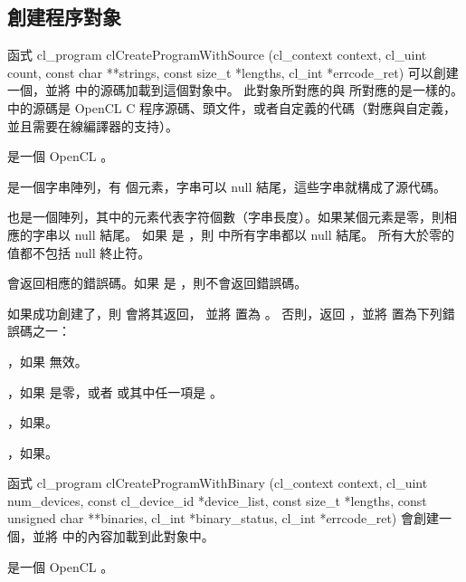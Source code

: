 \subsection{創建程序對象}

函式
\startclc
cl_program clCreateProgramWithSource (cl_context context,
			cl_uint count,
			const char **strings,
			const size_t *lengths,
			cl_int *errcode_ret)
\stopclc
可以創建一個，並將  中的源碼加載到這個對象中。
此對象所對應的與  所對應的是一樣的。
  中的源碼是 OpenCL C 程序源碼、頭文件，或者自定義的代碼（對應與自定義，並且需要在線編譯器的支持）。

 是一個 OpenCL 。

 是一個字串陣列，有  個元素，字串可以 null 結尾，這些字串就構成了源代碼。

 也是一個陣列，其中的元素代表字符個數（字串長度）。如果某個元素是零，則相應的字串以 null 結尾。
如果  是 ，則  中所有字串都以 null 結尾。
所有大於零的值都不包括 null 終止符。

 會返回相應的錯誤碼。如果  是 ，則不會返回錯誤碼。

如果成功創建了，則  會將其返回，
並將  置為 。
否則，返回 ，並將  置為下列錯誤碼之一：
\startigBase
\item {}，如果  無效。

\item {}，如果  是零，或者  或其中任一項是 。

\item {}，如果\scdevfailres。

\item {}，如果\schostfailres。
\stopigBase

函式
\startclc
cl_program clCreateProgramWithBinary (cl_context context,
			cl_uint num_devices,
			const cl_device_id *device_list,
			const size_t *lengths,
			const unsigned char **binaries,
			cl_int *binary_status,
			cl_int *errcode_ret)
\stopclc
會創建一個，並將  中的內容加載到此對象中。

 是一個 OpenCL 。

